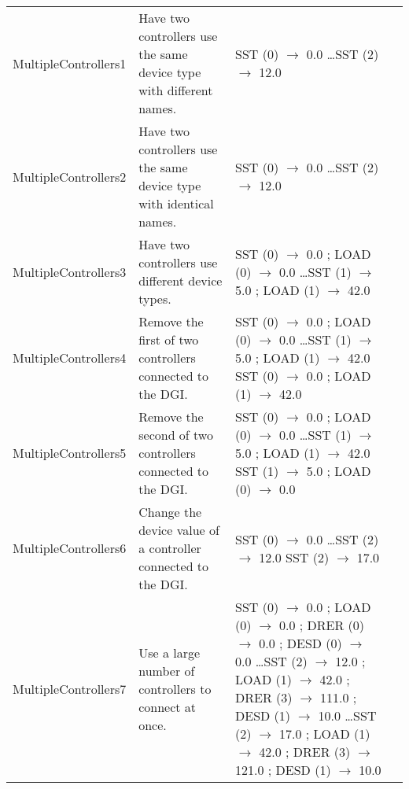 \documentclass{article}
\begin{document}
\begin{center}
\begin{footnotesize}
\begin{longtable}{|p{3cm}|p{4cm}|p{10cm}|c|}
    MultipleControllers1 & Have two controllers use the same device type with different names. & SST (0) $\rightarrow$ 0.0 \newline \ldots \newline SST (2) $\rightarrow$ 12.0 & \\
    MultipleControllers2 & Have two controllers use the same device type with identical names. & SST (0) $\rightarrow$ 0.0 \newline \ldots \newline SST (2) $\rightarrow$ 12.0 & \\
    MultipleControllers3 & Have two controllers use different device types. & SST (0) $\rightarrow$ 0.0 ; LOAD (0) $\rightarrow$ 0.0 \newline \ldots \newline SST (1) $\rightarrow$ 5.0 ; LOAD (1) $\rightarrow$ 42.0 & \\
    MultipleControllers4 & Remove the first of two controllers connected to the DGI. & SST (0) $\rightarrow$ 0.0 ; LOAD (0) $\rightarrow$ 0.0 \newline \ldots \newline SST (1) $\rightarrow$ 5.0 ; LOAD (1) $\rightarrow$ 42.0 \newline SST (0) $\rightarrow$ 0.0 ; LOAD (1) $\rightarrow$ 42.0 & \\
    MultipleControllers5 & Remove the second of two controllers connected to the DGI. & SST (0) $\rightarrow$ 0.0 ; LOAD (0) $\rightarrow$ 0.0 \newline \ldots \newline SST (1) $\rightarrow$ 5.0 ; LOAD (1) $\rightarrow$ 42.0 \newline SST (1) $\rightarrow$ 5.0 ; LOAD (0) $\rightarrow$ 0.0 & \\
    MultipleControllers6 & Change the device value of a controller connected to the DGI. & SST (0) $\rightarrow$ 0.0 \newline \ldots \newline SST (2) $\rightarrow$ 12.0 \newline SST (2) $\rightarrow$ 17.0 & \\
    MultipleControllers7 & Use a large number of controllers to connect at once. & SST (0) $\rightarrow$ 0.0 ; LOAD (0) $\rightarrow$ 0.0 ; DRER (0) $\rightarrow$ 0.0 ; DESD (0) $\rightarrow$ 0.0 \newline \ldots \newline SST (2) $\rightarrow$ 12.0 ; LOAD (1) $\rightarrow$ 42.0 ; DRER (3) $\rightarrow$ 111.0 ; DESD (1) $\rightarrow$ 10.0 \newline \ldots \newline SST (2) $\rightarrow$ 17.0 ; LOAD (1) $\rightarrow$ 42.0 ; DRER (3) $\rightarrow$ 121.0 ; DESD (1) $\rightarrow$ 10.0 & \\

\end{longtable}
\end{footnotesize}
\end{center}
\end{document}
